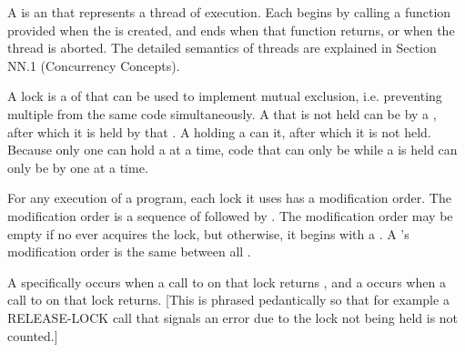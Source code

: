 \endsubsection%


A  is an  that represents a thread of
execution. Each  begins by calling a function provided
when the  is created, and ends when that function returns, or
when the thread is aborted. The detailed semantics of threads are
explained in Section NN.1 (Concurrency Concepts).


\endsubsection%


A lock is a  of  that can be used to
implement mutual exclusion, i.e. preventing multiple 
from  the same code simultaneously.
 A  that is not held can be
 by a , after which it is held by that
. A  holding a  can
 it, after which it is not held. Because only one
 can hold a  at a time, code that can only be
 while a  is held can only be
 by one  at a time.



For any execution of a program, each lock it uses has a modification
order. The modification order is a sequence of  followed by . The modification
order may be empty if no  ever acquires the lock, but
otherwise, it begins with a . A 's
modification order is the same between all .

A  specifically occurs when a call to
 on that lock returns , and a
 occurs when a call to  on
that lock returns. [This is phrased pedantically so that for example a
RELEASE-LOCK call that signals an error due to the lock not being held
is not counted.]

